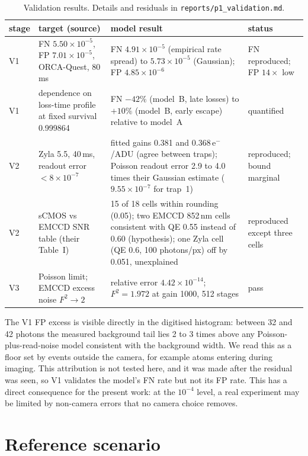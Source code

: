 \documentclass[11pt,a4paper]{article}
\newcommand{\file}[1]{\nolinkurl{#1}}
\newcommand{\elec}{e$^-$}
\begin{document}
\begin{table}[htbp]
\centering
\caption{Validation results. Details and residuals in \file{reports/p1_validation.md}.}
\label{tab:validation}
\footnotesize
\begin{tabularx}{\textwidth}{@{}l L L l@{}}
\toprule
stage & target (source) & model result & status \\
\midrule
V1 & FN $5.50\times10^{-5}$, FP $7.01\times10^{-5}$, ORCA-Quest, 80\,ms~\cite{manetsch} &
FN $4.91\times10^{-5}$ (empirical rate spread) to $5.73\times10^{-5}$ (Gaussian); FP $4.85\times10^{-6}$ &
FN reproduced; FP $14\times$ low \\
V1 & dependence on loss-time profile at fixed survival 0.999864 &
FN $-42\%$ (model~B, late losses) to $+10\%$ (model~B, early escape) relative to model~A & quantified \\
V2 & Zyla 5.5, 40\,ms, readout error $< 8\times10^{-7}$~\cite{picken} &
fitted gains 0.381 and 0.368\,\elec/ADU (agree between traps); Poisson readout error 2.9 to 4.0 times
their Gaussian estimate ($9.55\times10^{-7}$ for trap~1) & reproduced; bound marginal \\
V2 & sCMOS vs EMCCD SNR table (their Table~I) &
15 of 18 cells within rounding (0.05); two EMCCD 852\,nm cells consistent with QE 0.55 instead of 0.60 (hypothesis); one Zyla cell (QE 0.6, 100 photons/px) off by 0.051, unexplained & reproduced except three cells \\
V3 & Poisson limit; EMCCD excess noise $F^2 \to 2$~\cite{basden} &
relative error $4.42\times10^{-14}$; $F^2 = 1.972$ at gain 1000, 512 stages & pass \\
\bottomrule
\end{tabularx}
\end{table}

The V1 FP excess is visible directly in the digitised histogram: between 32 and 42 photons the
measured background tail lies 2 to 3 times above any Poisson-plus-read-noise model consistent with the
background width. We read this as a floor set by events outside the camera, for example atoms entering
during imaging. This attribution is not tested here, and it was made after the residual was seen, so
V1 validates the model's FN rate but not its FP rate. This has a direct consequence for the present work: at the $10^{-4}$ level, a real
experiment may be limited by non-camera errors that no camera choice removes.

\section{Reference scenario}
\label{sec:scenario}
\end{document}
